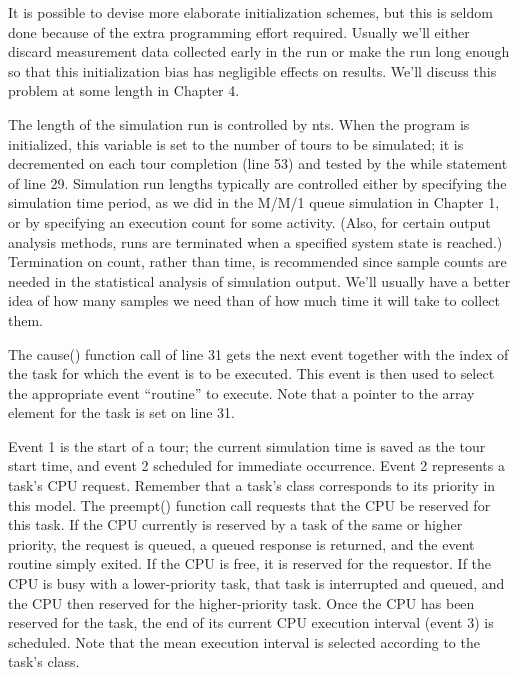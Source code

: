 It is possible to devise more elaborate initialization schemes, but this is
seldom done because of the extra programming effort required. Usually we'll
either discard measurement data collected early in the run or make the run
long enough so that this initialization bias has negligible effects on
results. We'll discuss this problem at some length in Chapter 4.

The length of the simulation run is controlled by nts. When the program is
initialized, this variable is set to the number of tours to be simulated; it is
decremented on each tour completion (line 53) and tested by the while
statement of line 29. Simulation run lengths typically are controlled either
by specifying the simulation time period, as we did in the M/M/1 queue
simulation in Chapter 1, or by specifying an execution count for some
activity. (Also, for certain output analysis methods, runs are terminated when
a specified system state is reached.) Termination on count, rather than time,
is recommended since sample counts are needed in the statistical analysis of
simulation output. We'll usually have a better idea of how many samples we
need than of how much time it will take to collect them.

The cause() function call of line 31 gets the next event together with the
index of the task for which the event is to be executed. This event is then
used to select the appropriate event ``routine'' to execute. Note that a
pointer to the array element for the task is set on line 31.

Event 1 is the start of a tour; the current simulation time is saved as the
tour start time, and event 2 scheduled for immediate occurrence. Event 2
represents a task's CPU request. Remember that a task's class corresponds to
its priority in this model. The preempt() function call requests that the CPU
be reserved for this task. If the CPU currently is reserved by a task of the
same or higher priority, the request is queued, a queued response is returned,
and the event routine simply exited. If the CPU is free, it is reserved for the
requestor. If the CPU is busy with a lower-priority task, that task is
interrupted and queued, and the CPU then reserved for the higher-priority
task. Once the CPU has been reserved for the task, the end of its current CPU
execution interval (event 3) is scheduled. Note that the mean execution
interval is selected according to the task's class.

